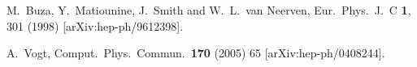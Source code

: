 \documentclass[10pt,a4paper]{article}
\begin{document}
\newpage
\begin{thebibliography}{alp}

  M.~Buza, Y.~Matiounine, J.~Smith and W.~L.~van Neerven,
  Eur.\ Phys.\ J.\  C {\bf 1}, 301 (1998)
  [arXiv:hep-ph/9612398].

  A.~Vogt,
  Comput.\ Phys.\ Commun.\  {\bf 170} (2005) 65
  [arXiv:hep-ph/0408244].

\end{thebibliography}
\end{document}
